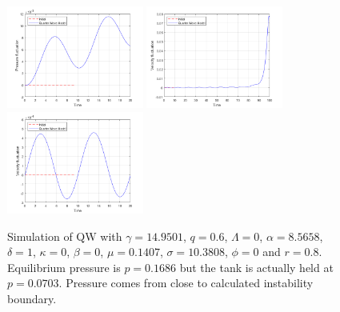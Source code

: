 \begin{figure}[!ht]
    \includegraphics[width=0.4\textwidth]{Figures/QWMSimulation/NearEquilibriumOscillations/B-Short.png}
    \includegraphics[width=0.4\textwidth]{Figures/QWMSimulation/NearEquilibriumOscillations/C.png}
    \includegraphics[width=0.4\textwidth]{Figures/QWMSimulation/NearEquilibriumOscillations/C-Short.png}
    \caption{Simulation of QW with $\gamma = 14.9501$, $q = 0.6$, $\Lambda = 0$, $\alpha = 8.5658$, $\delta = 1$, $\kappa = 0$, $\beta = 0$, $\mu = 0.1407$, $\sigma = 10.3808$, $\phi = 0$ and $r = 0.8$. Equilibrium pressure is $p = 0.1686$ but the tank is actually held at $p = 0.0703$. Pressure comes from close to calculated instability boundary.}
    \label{fig: QWNearEquil}
\end{figure}